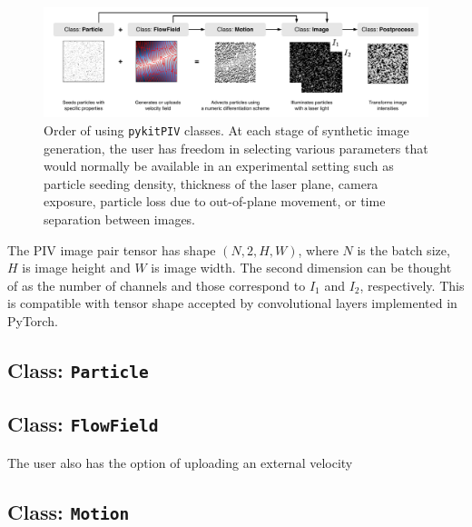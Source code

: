 \documentclass[a4paper,fleqn]{cas-dc}
\begin{document}
\begin{figure}[t]
\centering
\vspace{-0.4 in}
\includegraphics[width=\textwidth]{pykitPIV-modules.pdf}
\vspace{10 pt}
\caption{\footnotesize Order of using \texttt{pykitPIV} classes. At each stage of synthetic image generation, the user has freedom in selecting various parameters that would normally be available in an experimental setting such as particle seeding density, thickness of the laser plane, camera exposure, particle loss due to out-of-plane movement, or time separation between images.}
\label{fig:operations}
\end{figure}

The PIV image pair tensor has shape $(N, 2, H, W)$, where $N$ is the batch size, $H$ is image height and $W$ is image width. The second dimension can be thought of as the number of channels and those correspond to $I_1$ and $I_2$, respectively. This is compatible with tensor shape accepted by convolutional layers implemented in PyTorch.





\subsection{Class: \texttt{Particle}} \label{sec:class-particle}




\subsection{Class: \texttt{FlowField}} \label{sec:class-particle}

The user also has the option of uploading an external velocity




\subsection{Class: \texttt{Motion}} \label{sec:class-particle}
\end{document}
